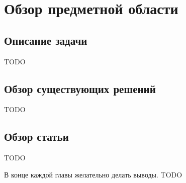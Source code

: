 \chapter{Обзор предметной области}

\section{Описание задачи}

TODO

\section{Обзор существующих решений}

TODO

\section{Обзор статьи~\cite{li2010practical}}

TODO

\chapterconclusion

В конце каждой главы желательно делать выводы. TODO
